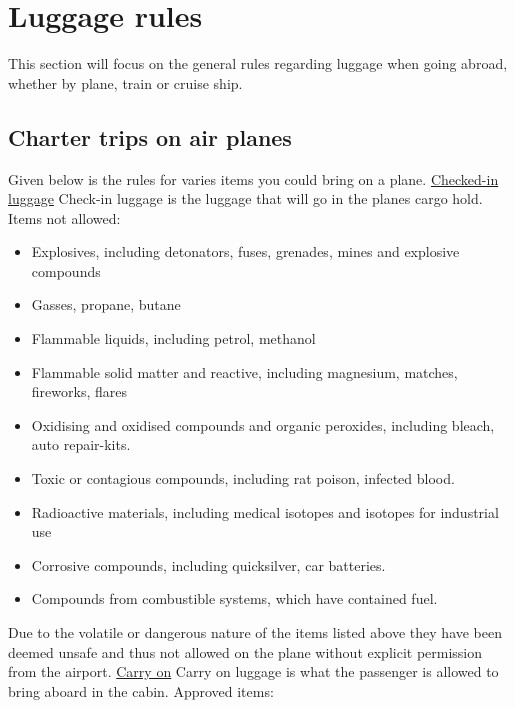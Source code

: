 \section{Luggage rules}
This section will focus on the general rules regarding luggage when going abroad, whether by plane, train or cruise ship.

\subsection{Charter trips on air planes}
Given below is the rules for varies items you could bring on a plane.
\newline
\newline
\underline{Checked-in luggage}\newline
Check-in luggage is the luggage that will go in the planes cargo hold.
\newline 
Items not allowed:
\begin{itemize}
\item Explosives, including detonators, fuses, grenades, mines and explosive compounds
\item Gasses, propane, butane
\item Flammable liquids, including petrol, methanol
\item Flammable solid matter and reactive, including magnesium, matches, fireworks, flares
\item Oxidising and oxidised compounds and organic peroxides, including bleach, auto repair-kits.
\item Toxic or contagious compounds, including rat poison, infected blood.
\item Radioactive materials, including medical isotopes and isotopes for industrial use
\item Corrosive compounds, including quicksilver, car batteries.
\item Compounds from combustible systems, which have contained fuel.
\end{itemize}
Due to the volatile or dangerous nature of the items listed above they have been deemed unsafe and thus not allowed on the plane without explicit permission from the airport.\newline
\newline
\underline{Carry on}\newline
Carry on luggage is what the passenger is allowed to bring aboard in the cabin.
\newline
Approved items:

